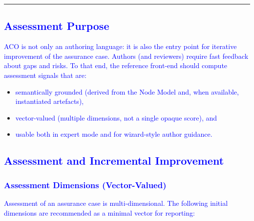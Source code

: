 \documentclass[11pt,twoside,a4paper]{article}
\begin{document}
\bigskip
\hrule
\bigskip


\subsection{\textcolor{blue}{Assessment Purpose}}

\textcolor{blue}{ACO is not only an authoring language: it is also the entry point for iterative improvement of the assurance case. Authors (and reviewers) require fast feedback about gaps and risks. To that end, the reference front-end should compute assessment signals that are:}
\begin{itemize}[leftmargin=2em]
  \item \textcolor{blue}{semantically grounded (derived from the Node Model and, when available, instantiated artefacts),}
  \item \textcolor{blue}{vector-valued (multiple dimensions, not a single opaque score), and}
  \item \textcolor{blue}{usable both in expert mode and for wizard-style author guidance.}
\end{itemize}

\subsection{\textcolor{blue}{Assessment and Incremental Improvement}}\label{sec:assessment}

\subsubsection{\textcolor{blue}{Assessment Dimensions (Vector-Valued)}}

\textcolor{blue}{Assessment of an assurance case is multi-dimensional. The following initial dimensions are recommended as a minimal vector for reporting:}
\end{document}
